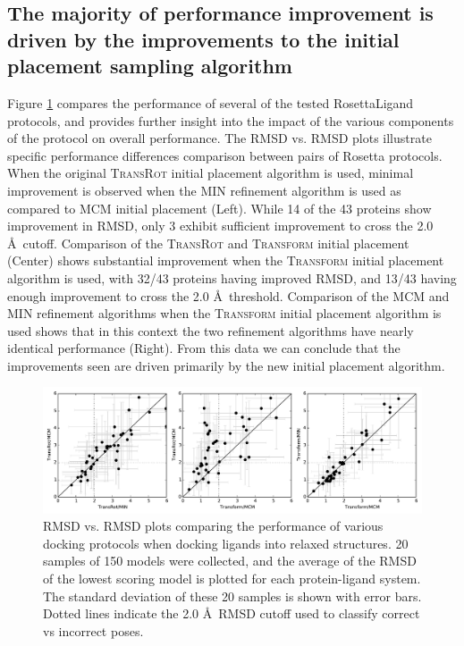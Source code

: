 \subsection{The majority of performance improvement is driven by the improvements to the initial placement sampling algorithm}
Figure \ref{fig:rmsd_vs_rmsd} compares the performance of several of the tested RosettaLigand protocols, and provides further insight into the impact of the various components of the protocol on overall performance.
The \ac{RMSD} vs. \ac{RMSD} plots illustrate specific performance differences comparison between pairs of Rosetta protocols.
When the original \textsc{TransRot} initial placement algorithm is used, minimal improvement is observed when the \ac{MIN} refinement algorithm is used as compared to \ac{MCM} initial placement (Left).
While 14 of the 43 proteins show improvement in \ac{RMSD}, only 3 exhibit sufficient improvement to cross the 2.0 \AA\ cutoff.
Comparison of the \textsc{TransRot} and \textsc{Transform} initial placement (Center) shows substantial improvement when the \textsc{Transform} initial placement algorithm is used, with 32/43 proteins having improved \ac{RMSD}, and 13/43 having enough improvement to cross the 2.0 \AA\ threshold.
Comparison of the \ac{MCM} and \ac{MIN} refinement algorithms when the \textsc{Transform} initial placement algorithm is used shows that in this context the two refinement algorithms have nearly identical performance (Right).
From this data we can conclude that the improvements seen are driven primarily by the new initial placement algorithm. 
\begin{figure}
\centering
\includegraphics[width=6in]{figures/lowres/rmsd_vs_rmsd_relax.pdf}
\caption{
\acs{RMSD} vs. \acs{RMSD} plots comparing the performance of various docking protocols when docking ligands into relaxed structures.
20 samples of 150 models were collected, and the average of the \acs{RMSD} of the lowest scoring model is plotted for each protein-ligand system.
The standard deviation of these 20 samples is shown with error bars. Dotted lines indicate the 2.0 \AA\ \acs{RMSD} cutoff used to classify correct vs incorrect poses. 
}
\label{fig:rmsd_vs_rmsd}
\end{figure}
